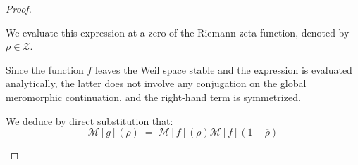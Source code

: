 \documentclass[Riemann_Hypothesis.tex]{subfiles}
\begin{document}
\begin{proof}
\begin{part_proof}
\begin{equation*}
        \end{equation*}
        We evaluate this expression at a zero of the Riemann zeta function, denoted by $\rho \in \mathcal{Z}$. \par
        Since the function $f$ leaves the Weil space stable and the expression is evaluated analytically, the latter does not involve any conjugation on the global meromorphic continuation, and the right-hand term is symmetrized. \par
        We deduce by direct substitution that:
        \begin{equation*}
            \mathcal{M}[g](\rho) \;=\; \mathcal{M}[f](\rho) \mathcal{M}[f](1-\overline{\rho})
        \end{equation*}
    \end{part_proof}


\end{proof}
\end{document}
